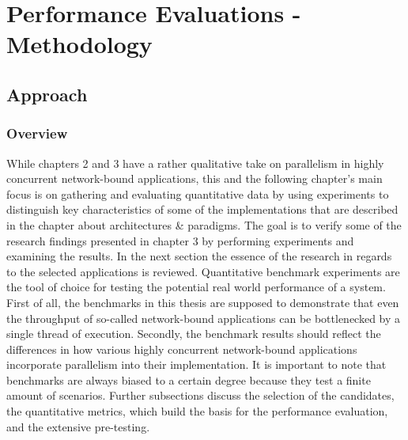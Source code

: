 \chapter{Performance Evaluations - Methodology}
\section{Approach}
\subsection{Overview}
While chapters 2 and 3 have a rather qualitative take on parallelism in highly concurrent network-bound applications, this and the following chapter’s main focus is on gathering and evaluating quantitative data by using experiments to distinguish key characteristics of some of the implementations that are described in the chapter about architectures \& paradigms. \newline
The goal is to verify some of the research findings presented in chapter 3 by performing experiments and examining the results. In the next section the essence of the research in regards to the selected applications is reviewed. Quantitative benchmark experiments are the tool of choice for testing the potential real world performance of a system. \newline
First of all, the benchmarks in this thesis are supposed to demonstrate that even the throughput of so-called network-bound applications can be bottlenecked by a single thread of execution. Secondly, the benchmark results should reflect the differences in how various highly concurrent network-bound applications incorporate parallelism into their implementation. It is important to note that benchmarks are always biased to a certain degree because they test a finite amount of scenarios. \newline
Further subsections discuss the selection of the candidates, the quantitative metrics, which build the basis for the performance evaluation, and the extensive pre-testing.

